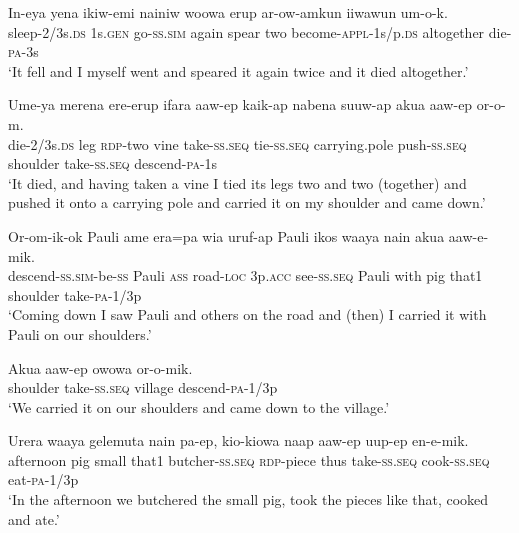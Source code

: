 \ea
\gll  In-eya  yena  ikiw-emi  nainiw  woowa  erup  ar-ow-amkun           iiwawun  um-o-k. \\
sleep-2/3s.\textsc{ds}  1s.\textsc{gen}  go-\textsc{ss}.\textsc{sim}  again  spear  two  become-\textsc{appl}-1s/p.\textsc{ds} altogether  die-\textsc{pa}-3s \\


\glt ‘It fell and I myself went and speared it again twice and it died altogether.’ \\
\z


\ea
\gll  Ume-ya  merena  ere-erup  ifara  aaw-ep  kaik-ap  nabena            suuw-ap  akua  aaw-ep  or-o-m. \\
die-2/3s.\textsc{ds}  leg  \textsc{rdp}-two  vine  take-\textsc{ss.seq}  tie-\textsc{ss.seq}  carrying.pole   push-\textsc{ss.seq}  shoulder  take-\textsc{ss.seq}  descend-\textsc{pa}-1s \\


\glt ‘It died, and having taken a vine I tied its legs two and two (together) and pushed it onto a carrying pole and carried it on my shoulder and came down.’ \\
\z


\ea
\gll  Or-om-ik-ok  Pauli  ame  era=pa  wia  uruf-ap  Pauli  ikos             waaya  nain  akua  aaw-e-mik. \\
descend-\textsc{ss}.\textsc{sim}-be-\textsc{ss}  Pauli  \textsc{ass}  road-\textsc{loc}  3p.\textsc{acc}  see-\textsc{ss.seq}  Pauli  with  pig  that1  shoulder  take-\textsc{pa}-1/3p \\


\glt ‘Coming down I saw Pauli and others on the road and (then) I carried it with Pauli on our shoulders.’ \\
\z


\ea
\gll  Akua  aaw-ep  owowa  or-o-mik. \\
shoulder  take-\textsc{ss.seq}  village  descend-\textsc{pa}-1/3p \\
\glt ‘We carried it on our shoulders and came down to the village.’ \\
\z


\ea
\gll  Urera  waaya  gelemuta  nain  pa-ep,  kio-kiowa  naap  aaw-ep         uup-ep  en-e-mik. \\
afternoon  pig  small  that1  butcher-\textsc{ss.seq}  \textsc{rdp}-piece  thus  take-\textsc{ss.seq}  cook-\textsc{ss.seq}  eat-\textsc{pa}-1/3p \\


\glt ‘In the afternoon we butchered the small pig, took the pieces like that, cooked and ate.’ \\
\z


